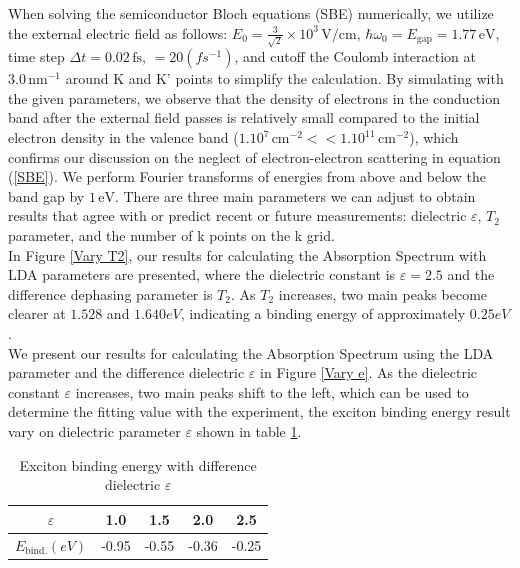 \documentclass[12pt,english,a4paper]{article}
\begin{document}
\quad When solving the semiconductor Bloch equations (SBE) numerically, we utilize the external electric field as follows: \(E_0 = \frac{3}{\sqrt{2}} \times 10^3 \, \text{V/cm}\), \(\hbar \omega_0 = E_{\text{gap}} = 1.77 \, \text{eV}\), time step \(\Delta t = 0.02 \, \text{fs}\), $ = 20 (fs^{-1})$, and cutoff the Coulomb interaction at \(3.0 \, \text{nm}^{-1}\) around K and K' points to simplify the calculation. By simulating with the given parameters, we observe that the density of electrons in the conduction band after the external field passes is relatively small compared to the initial electron density in the valence band (\(1.10^{7} \, \text{cm}^{-2} << 1.10^{11} \, \text{cm}^{-2}\)), which confirms our discussion on the neglect of electron-electron scattering in equation (\ref{SBE}). We perform Fourier transforms of energies from above and below the band gap by \(1 \, \text{eV}\). There are three main parameters we can adjust to obtain results that agree with or predict recent or future measurements: dielectric \(\varepsilon\), \(T_2\) parameter, and the number of k points on the k grid.\\\null
\quad In Figure \ref{Vary T2}, our results for calculating the Absorption Spectrum with LDA parameters are presented, where the dielectric constant is $\varepsilon = 2.5$ and the difference dephasing parameter is $T_2$. As $T_2$ increases, two main peaks become clearer at $1.528$ and $1.640 eV$, indicating a binding energy of approximately $0.25 eV$.\\ \null 
\quad We present our results for calculating the Absorption Spectrum using the LDA parameter and the difference dielectric $\varepsilon$ in Figure \ref{Vary e}. As the dielectric constant $\varepsilon$ increases, two main peaks shift to the left, which can be used to determine the fitting value with the experiment, the exciton binding energy result vary on dielectric parameter $\varepsilon$ shown in table \ref{Binding table}.\\\null
\begin{table}[]
	\begin{center}
		\begin{tabular}{| c | c | c | c | c|}
			\hline
			$\varepsilon$ & 1.0 & 1.5 & 2.0 & 2.5\\\hline
			$E_{\mathrm{bind.}} (eV)$ & -0.95 & -0.55 & -0.36 & -0.25\\\hline
		\end{tabular}
		\caption[Exciton binding energy with difference dielectric]{Exciton binding energy with difference dielectric $\varepsilon$}
		\label{Binding table}
	\end{center}
\end{table}
\end{document}
